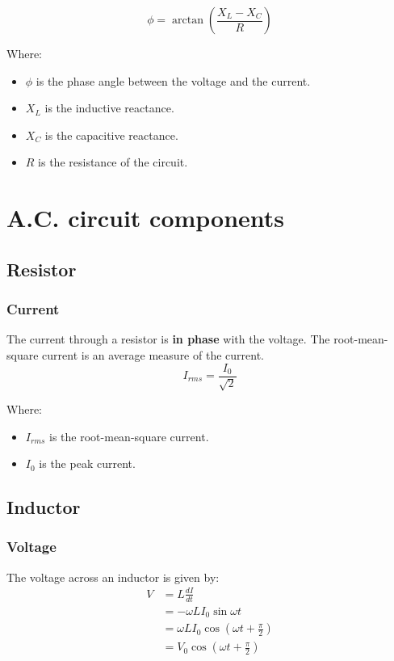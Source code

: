 \documentclass[11pt]{article}
\begin{document}
\[\phi = \arctan \left(\frac{X_L - X_C}{R} \right)\]

Where:
\begin{itemize}
\item \(\phi\) is the phase angle between the voltage and the current.
\item \(X_L\) is the inductive reactance.
\item \(X_C\) is the capacitive reactance.
\item \(R\) is the resistance of the circuit.
\end{itemize}



\section{A.C. circuit components}
\label{sec:orga952f94}

\subsection{Resistor}
\label{sec:org336aec6}

\subsubsection{Current}
\label{sec:orgf3fe8f7}
The current through a resistor is \textbf{in phase} with the voltage. The root-mean-square current is an average measure of the current.
\[I_{rms} = \frac{I_0}{\sqrt{2}}\]

Where:
\begin{itemize}
\item \(I_{rms}\) is the root-mean-square current.
\item \(I_0\) is the peak current.
\end{itemize}

\subsection{Inductor}
\label{sec:org9e60949}

\subsubsection{Voltage}
\label{sec:orgc2f8110}
The voltage across an inductor is given by:
\begin{align*}
V &= L\frac{dI}{dt} \\
&= - \omega L I_0 \sin \omega t \\
&= \omega L I_0 \cos \left(\omega t + \frac{\pi}{2} \right) \\
&= V_0 \cos \left(\omega t + \frac{\pi}{2} \right)
\end{align*}
\end{document}
